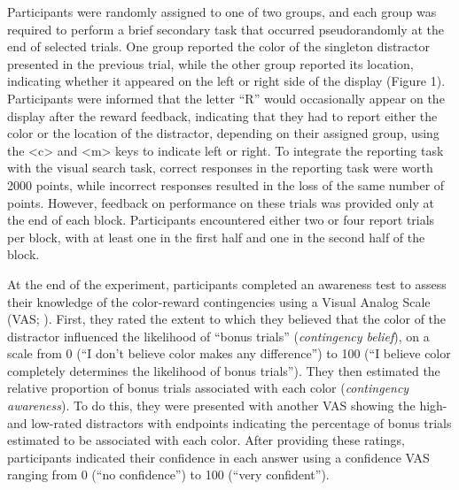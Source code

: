 \documentclass[
  jou,
  floatsintext,
  longtable,
  nolmodern,
  notxfonts,
  notimes,
  colorlinks=true,linkcolor=blue,citecolor=blue,urlcolor=blue]{apa7}
\begin{document}
Participants were randomly assigned to one of two groups, and each group
was required to perform a brief secondary task that occurred
pseudorandomly at the end of selected trials. One group reported the
color of the singleton distractor presented in the previous trial, while
the other group reported its location, indicating whether it appeared on
the left or right side of the display (Figure 1). Participants were
informed that the letter ``R'' would occasionally appear on the display
after the reward feedback, indicating that they had to report either the
color or the location of the distractor, depending on their assigned
group, using the \textless c\textgreater{} and \textless m\textgreater{}
keys to indicate left or right. To integrate the reporting task with the
visual search task, correct responses in the reporting task were worth
2000 points, while incorrect responses resulted in the loss of the same
number of points. However, feedback on performance on these trials was
provided only at the end of each block. Participants encountered either
two or four report trials per block, with at least one in the first half
and one in the second half of the block.

At the end of the experiment, participants completed an awareness test
to assess their knowledge of the color-reward contingencies using a
Visual Analog Scale (VAS; ). First, they rated the extent to which they believed that the
color of the distractor influenced the likelihood of ``bonus trials''
(\emph{contingency belief}), on a scale from 0 (``I don't believe color
makes any difference'') to 100 (``I believe color completely determines
the likelihood of bonus trials''). They then estimated the relative
proportion of bonus trials associated with each color (\emph{contingency
awareness}). To do this, they were presented with another VAS showing
the high- and low-rated distractors with endpoints indicating the
percentage of bonus trials estimated to be associated with each color.
After providing these ratings, participants indicated their confidence
in each answer using a confidence VAS ranging from 0 (``no confidence'')
to 100 (``very confident'').
\end{document}
